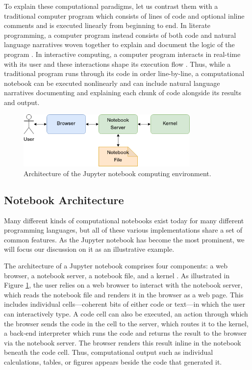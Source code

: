 \documentclass[11pt,letterpaper]{article}
\begin{document}
To explain these computational paradigms, let us contrast them with a traditional computer program which consists of lines of code and optional inline comments and is executed linearly from beginning to end. In literate programming, a computer program instead consists of both code and natural language narratives woven together to explain and document the logic of the program \citep{knuth_literate_1992}. In interactive computing, a computer program interacts in real-time with its user and these interactions shape its execution flow \citep{perez_ipython:_2007}. Thus, while a traditional program runs through its code in order line-by-line, a computational notebook can be executed nonlinearly and can include natural language narratives documenting and explaining each chunk of code alongside its results and output.

\begin{figure}[tbp]
	\centering
	\includegraphics[width=0.8\textwidth]{notebook-architecture.png}
	\caption{Architecture of the Jupyter notebook computing environment.}
	\label{fig:notebook_architecture}
\end{figure}

\subsection{Notebook Architecture}

Many different kinds of computational notebooks exist today for many different programming languages, but all of these various implementations share a set of common features. As the Jupyter notebook has become the most prominent, we will focus our discussion on it as an illustrative example.

The architecture of a Jupyter notebook comprises four components: a web browser, a notebook server, a notebook file, and a kernel \citep{kluyver_jupyter_2016}. As illustrated in Figure \ref{fig:notebook_architecture}, the user relies on a web browser to interact with the notebook server, which reads the notebook file and renders it in the browser as a web page. This includes individual cells---coherent bits of either code or text---in which the user can interactively type. A code cell can also be executed, an action through which the browser sends the code in the cell to the server, which routes it to the kernel, a back-end interpreter which runs the code and returns the result to the browser via the notebook server. The browser renders this result inline in the notebook beneath the code cell. Thus, computational output such as individual calculations, tables, or figures appears beside the code that generated it.
\end{document}
